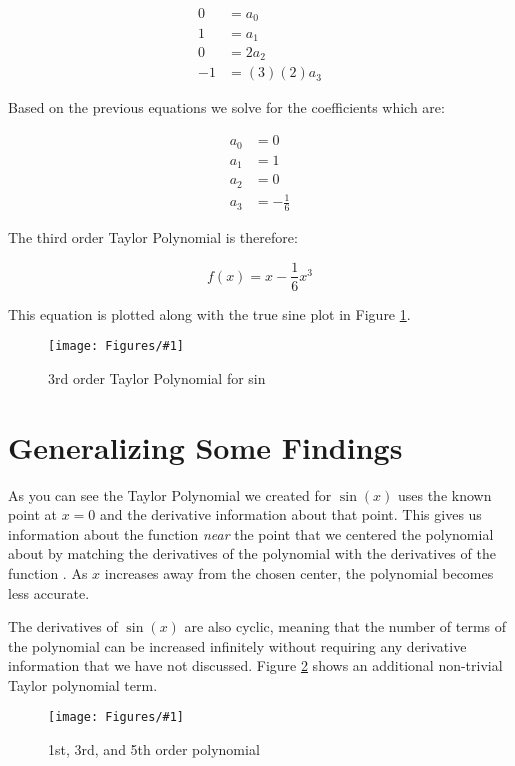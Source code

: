 \documentclass[landscape, twocolumn, 12pt]{article}
\newcommand{\fig}[2]{
\begin{figure}
  \centering
  \texttt{[image: Figures/\#1]}
  \caption{#2}
  \label{Fig:#1}
\end{figure}
}
\begin{document}
\begin{align}
  0 &= a_0\\ 
  1  &=a_1 \\
  0 &=2a_2\\
  -1 &=(3)(2)a_3
\end{align}

Based on the previous equations we solve for the coefficients which are:

\begin{align*}
  a_0&=0 \\ a_1&=1 \\ a_2&=0 \\ a_3&=-\frac{1}{6}
\end{align*}

The third order Taylor Polynomial is therefore:

\begin{equation}
  f(x) = x - \frac{1}{6}x^3
\end{equation}

 This equation is plotted along with the true sine plot in Figure \ref{Fig:3ordersin}.

\fig{3ordersin}{3rd order Taylor Polynomial for sin}

\section{Generalizing Some Findings}
As you can see the Taylor Polynomial we created for $\sin(x)$ uses the known point at $x=0$ and the derivative information about that point. This gives us information about the function \textit{near} the point that we centered the polynomial about by matching the derivatives of the polynomial with the derivatives of the function \cite{3Brown1Blue-taylorseries}. As $x$ increases away from the chosen center, the polynomial becomes less accurate.

The derivatives of $\sin(x)$ are also cyclic, meaning that the number of terms of the polynomial can be increased infinitely without requiring any derivative information that we have not discussed. Figure \ref{Fig:135ordersin} shows an additional non-trivial Taylor polynomial term.

\fig{135ordersin}{1st, 3rd, and 5th order polynomial}


\newpage


\end{document}
